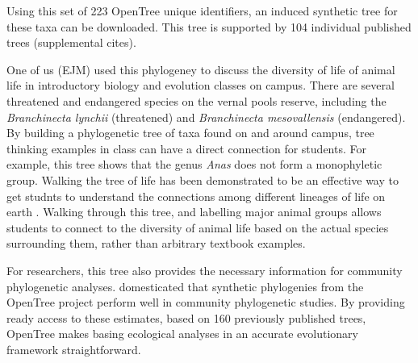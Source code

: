 \documentclass[oupdraft]{sysbio_sse}
\begin{document}
Using this set of 223 OpenTree unique identifiers, an induced synthetic tree for these taxa can be downloaded. This tree is supported by 104 individual published trees (supplemental cites).

One of us (EJM) used this phylogeney to discuss the diversity of life of animal life in introductory biology and evolution classes on campus.
There are several threatened and endangered species on the vernal pools reserve, including the \textit{Branchinecta lynchii} (threatened) and \textit{Branchinecta mesovallensis} (endangered). 
By building a phylogenetic tree of taxa found on and around campus, tree thinking examples in class can have a direct connection for students. For example, this tree shows that the genus \textit{Anas} does not form a monophyletic group. Walking the tree of life has been demonstrated to be an effective way to get studnts to understand the connections among different lineages of life on earth \citep{ballen_walking_2017}. Walking through this tree, and labelling major animal groups allows students to connect to the diversity of animal life based on the actual species surrounding them, rather than arbitrary textbook examples.

For researchers, this tree also provides the necessary information for community phylogenetic analyses. \citet{li_for_2019} domesticated that synthetic phylogenies from the OpenTree project perform well in community phylogenetic studies. By providing ready access to these estimates, based on 160 previously published trees, OpenTree makes basing ecological analyses in an accurate evolutionary framework straightforward.
\end{document}
